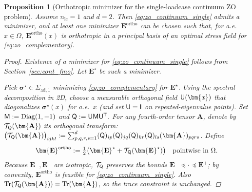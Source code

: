 \documentclass[preprint,3p]{elsarticle}
\newcommand{\tens}[1]{\bm{\mathit{#1}}}             %
\newcommand{\tenss}[1]{\bm{\mathbf{#1}}}            %
\newcommand{\tensf}[1]{\bm{\mathbf{#1}}}            %
\newcommand{\trn}{\mathsf{T}}                       %
\newcommand{\stress}{\tenss{\sigma}}                %
\newcommand{\Emin}{\tensf{E}^{-}}                   %
\newcommand{\Emax}{\tensf{E}^{+}}                   %
\newcommand{\nlc}{n_\mathrm{lc}}                    %
\newcommand{\semtrx}[1]{\ifcat\noexpand#1\relax\bm{#1}\else\mathsf{#1}\fi}
\newcommand{\Tr}{\operatorname{Tr}}
\newtheorem{proposition}{Proposition}[section]
\begin{document}
\begin{proposition}[Orthotropic minimizer for the single-loadcase continuum ZO problem]\label{prop:zo_orthotropic_representative}
Assume $\nlc=1$ and $d=2$. Then \eqref{eq:zo_continuum_single} admits a minimizer, and at least one minimizer $\tensf E^{\mathrm{ortho}}$ can be chosen such that, for a.e.\ $\tens x\in\Omega$, $\tensf E^{\mathrm{ortho}}(\tens x)$ is orthotropic in a principal basis of an optimal stress field for \eqref{eq:zo_complementary}.
%
\begin{proof}
Existence of a minimizer for \eqref{eq:zo_continuum_single} follows from Section~\ref{sec:cont_fmo}. Let $\tensf E^\star$ be such a minimizer.

Pick $\stress^\star\in\Sigma_{\mathrm{ad},1}$ minimizing \eqref{eq:zo_complementary} for $\tensf E^\star$. Using the spectral decomposition in 2D, choose a measurable orthogonal field $\semtrx U(\tens x)$ that diagonalizes $\stress^\star(\tens x)$ for a.e.\ $\tens x$ (and set $\semtrx U=\semtrx I$ on repeated-eigenvalue points). Set $\semtrx M:=\mathrm{Diag}(1,-1)$ and $\semtrx Q:=\semtrx U\semtrx M\semtrx U^\trn$. For any fourth-order tensor $\tensf A$, denote by $\mathcal T_{\semtrx Q}(\tensf A)$ its orthogonal transform:
$\big(\mathcal T_{\semtrx Q}(\tensf A)\big)_{ijkl}:=\sum_{p,q,r,s=1}^{d}(\semtrx{Q})_{ip}(\semtrx{Q})_{jq}(\semtrx{Q})_{kr}(\semtrx{Q})_{ls}(\tensf{A})_{pqrs}$.
Define
%
\begin{equation}
\tensf E^{\mathrm{ortho}}
:=\tfrac12\big(\tensf E^\star+\mathcal T_{\semtrx Q}(\tensf E^\star)\big)
\quad\text{pointwise in }\Omega.
\end{equation}
%
Because $\Emin,\Emax$ are isotropic, $\mathcal T_{\semtrx Q}$ preserves the bounds $\Emin\preceq\cdot\preceq\Emax$; by convexity, $\tensf E^{\mathrm{ortho}}$ is feasible for \eqref{eq:zo_continuum_single}. Also $\Tr(\mathcal T_{\semtrx Q}(\tensf A))=\Tr(\tensf A)$, so the trace constraint is unchanged.


\end{proof}
\end{proposition}
\end{document}

